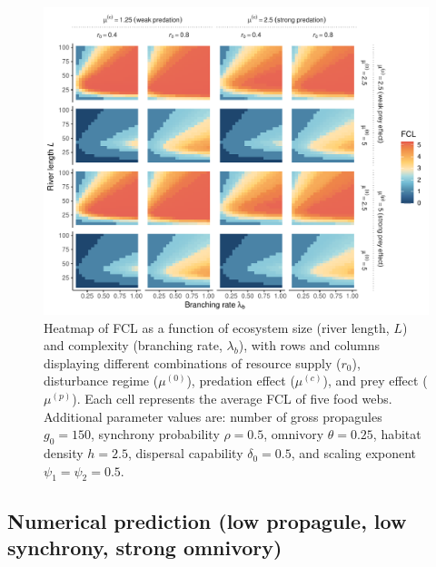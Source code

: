 \begin{figure}
\centering
\includegraphics{../data_fmt/fig_rho05_g150_theta025.pdf}
\caption{Heatmap of FCL as a function of ecosystem size (river length,
\(L\)) and complexity (branching rate, \(\lambda_b\)), with rows and
columns displaying different combinations of resource supply (\(r_0\)),
disturbance regime (\(\mu^{(0)}\)), predation effect (\(\mu^{(c)}\)),
and prey effect (\(\mu^{(p)}\)). Each cell represents the average FCL of
five food webs. Additional parameter values are: number of gross
propagules \(g_0=150\), synchrony probability \(\rho=0.5\), omnivory
\(\theta=0.25\), habitat density \(h=2.5\), dispersal capability
\(\delta_0=0.5\), and scaling exponent \(\psi_1=\psi_2=0.5\).}
\end{figure}

\newpage

\subsection{Numerical prediction (low propagule, low synchrony, strong
omnivory)}\label{numerical-prediction-low-propagule-low-synchrony-strong-omnivory}

